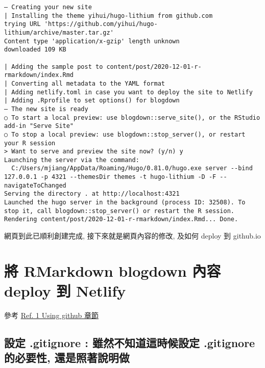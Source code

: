 \documentclass[
]{book}
\begin{document}
\begin{verbatim}
― Creating your new site
| Installing the theme yihui/hugo-lithium from github.com
trying URL 'https://github.com/yihui/hugo-lithium/archive/master.tar.gz'
Content type 'application/x-gzip' length unknown
downloaded 109 KB

| Adding the sample post to content/post/2020-12-01-r-rmarkdown/index.Rmd
| Converting all metadata to the YAML format
| Adding netlify.toml in case you want to deploy the site to Netlify
| Adding .Rprofile to set options() for blogdown
― The new site is ready
○ To start a local preview: use blogdown::serve_site(), or the RStudio add-in "Serve Site"
○ To stop a local preview: use blogdown::stop_server(), or restart your R session
> Want to serve and preview the site now? (y/n) y
Launching the server via the command:
  C:/Users/mjiang/AppData/Roaming/Hugo/0.81.0/hugo.exe server --bind 127.0.0.1 -p 4321 --themesDir themes -t hugo-lithium -D -F --navigateToChanged
Serving the directory . at http://localhost:4321
Launched the hugo server in the background (process ID: 32508). To stop it, call blogdown::stop_server() or restart the R session.
Rendering content/post/2020-12-01-r-rmarkdown/index.Rmd... Done.
\end{verbatim}

網頁到此已順利創建完成, 接下來就是網頁內容的修改, 及如何 deploy 到 github.io

\hypertarget{ux5c07-rmarkdown-blogdown-ux5167ux5bb9-deploy-ux5230-netlify}{%
\chapter{將 RMarkdown blogdown 內容 deploy 到 Netlify}\label{ux5c07-rmarkdown-blogdown-ux5167ux5bb9-deploy-ux5230-netlify}}

參考 \href{https://alison.rbind.io/post/new-year-new-blogdown/\#using-github}{Ref. 1 Using github 章節}

\hypertarget{ux8a2dux5b9a-.gitignore-ux96d6ux7136ux4e0dux77e5ux9053ux9019ux6642ux5019ux8a2dux5b9a-.gitignore-ux7684ux5fc5ux8981ux6027-ux9084ux662fux7167ux8457ux8aaaux660eux505a}{%
\section{設定 .gitignore : 雖然不知道這時候設定 .gitignore 的必要性, 還是照著說明做}\label{ux8a2dux5b9a-.gitignore-ux96d6ux7136ux4e0dux77e5ux9053ux9019ux6642ux5019ux8a2dux5b9a-.gitignore-ux7684ux5fc5ux8981ux6027-ux9084ux662fux7167ux8457ux8aaaux660eux505a}}
\end{document}
